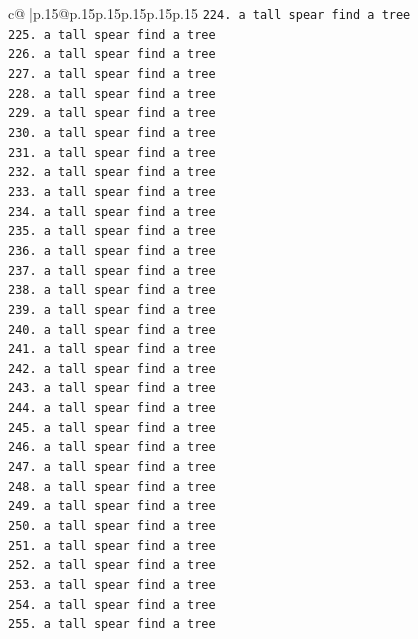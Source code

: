 \documentclass{article}
\begin{document}
{\begin{supertabular}{c@{$\;$}|p{.15\linewidth}@{}p{.15\linewidth}p{.15\linewidth}p{.15\linewidth}p{.15\linewidth}p{.15\linewidth}}
{{{\texttt{224. a tall spear find a tree} \\
\texttt{225. a tall spear find a tree} \\
\texttt{226. a tall spear find a tree} \\
\texttt{227. a tall spear find a tree} \\
\texttt{228. a tall spear find a tree} \\
\texttt{229. a tall spear find a tree} \\
\texttt{230. a tall spear find a tree} \\
\texttt{231. a tall spear find a tree} \\
\texttt{232. a tall spear find a tree} \\
\texttt{233. a tall spear find a tree} \\
\texttt{234. a tall spear find a tree} \\
\texttt{235. a tall spear find a tree} \\
\texttt{236. a tall spear find a tree} \\
\texttt{237. a tall spear find a tree} \\
\texttt{238. a tall spear find a tree} \\
\texttt{239. a tall spear find a tree} \\
\texttt{240. a tall spear find a tree} \\
\texttt{241. a tall spear find a tree} \\
\texttt{242. a tall spear find a tree} \\
\texttt{243. a tall spear find a tree} \\
\texttt{244. a tall spear find a tree} \\
\texttt{245. a tall spear find a tree} \\
\texttt{246. a tall spear find a tree} \\
\texttt{247. a tall spear find a tree} \\
\texttt{248. a tall spear find a tree} \\
\texttt{249. a tall spear find a tree} \\
\texttt{250. a tall spear find a tree} \\
\texttt{251. a tall spear find a tree} \\
\texttt{252. a tall spear find a tree} \\
\texttt{253. a tall spear find a tree} \\
\texttt{254. a tall spear find a tree} \\
\texttt{255. a tall spear find a tree} \\
}}}
\end{supertabular}}
\end{document}
